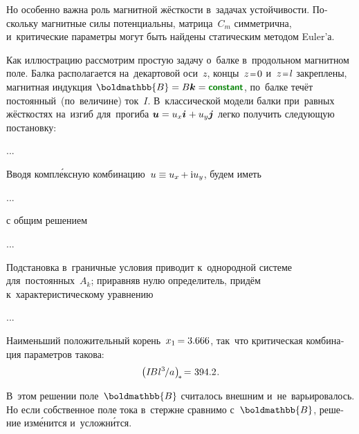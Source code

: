 \begin{otherlanguage}{russian}
Но особенно важна роль магнитной жёсткости в~задачах устойчивости. Поскольку магнитные силы потенциальны, матрица~$C_m$ симметрична, и~критические параметры могут быть найдены статическим методом Euler’а.

Как иллюстрацию рассмотрим простую задачу о~балке в~продольном магнитном поле. Балка располагается на~декартовой оси~$z$, концы~${z \narroweq 0}$ и~${z \narroweq l}$ закреплены, магнитная индукция ${\boldmathbb{B} = B\bm{k} = \boldconstant}$, по~балке течёт постоянный~(по~величине) ток~$I$. В~классической модели балки при~равных жёсткостях на~изгиб для~прогиба ${\bm{u} = u_x\bm{i} \hspace{.12ex} + u_y\bm{j}}$ легко получить следующую постановку:

...

Вводя компл\'{е}ксную комбинацию~${u \equiv u_x \hspace{-0.16ex} + \mathrm{i} u_y}$, будем иметь

...

\noindent с общим решением

...

\noindent Подстановка в~граничные условия приводит к~однородной системе для~постоянных~${A_k}$; приравняв нулю определитель, придём к~характеристическому уравнению

...


\noindent Наименьший положительный корень~${x_1 \hspace{-0.2ex} = 3.666}$, так~что критическая комбинация параметров такова:
\[
\left( I \hspace{-0.25ex} B \hspace{.1ex} {l^3} \hspace{-0.2ex} / a \hspace{.1ex} \right)_{\hspace{-0.32ex}*} \hspace{-0.32ex} = \hspace{.1ex} 394.2 \hspace{.12ex}.
\]

В~этом решении поле~$\boldmathbb{B}$ считалось внешним и~не~варьировалось. Но если собственное поле тока в~стержне сравнимо с~$\boldmathbb{B}$, решение изм\'{е}нится и~усложн\'{и}тся.

\end{otherlanguage}

\section*{\small \wordforbibliography}

